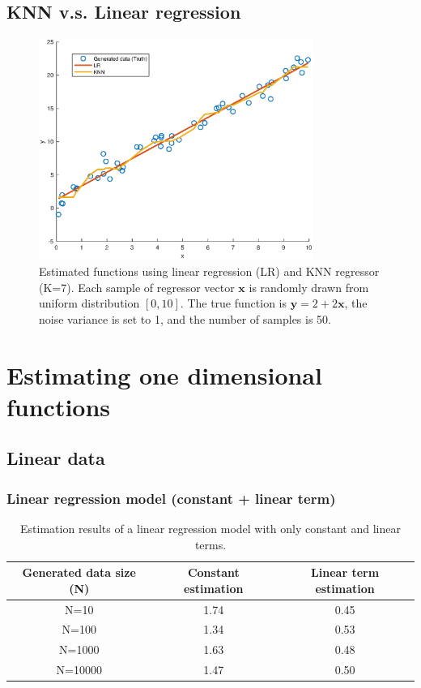 \documentclass[]{article}
\begin{document}
\subsection{KNN v.s. Linear regression}
\begin{figure}[H]
	\caption{Estimated functions using linear regression (LR) and KNN regressor (K=7). Each sample of regressor vector $\mathbf{x}$ is randomly drawn from uniform distribution $[0,10]$. The true function is $\mathbf{y}=2+2\mathbf{x}$, the noise variance is set to 1, and the number of samples is 50.}
	\centering
	\includegraphics[width=0.8\textwidth]{project2b}
\end{figure}

\section{Estimating one dimensional functions}

\subsection{Linear data}

\subsubsection{Linear regression model (constant + linear term)}
\begin{table}[H]
	\centering
	\caption{Estimation results of a linear regression model with only constant and linear terms.}
	\label{tab:linear}
	\begin{tabular}{@{}ccc@{}}
		\toprule
		Generated data size (N) & Constant estimation & Linear term estimation \\ \midrule
		N=10        & 1.74                & 0.45                   \\
		N=100       & 1.34                & 0.53                   \\
		N=1000      & 1.63                & 0.48                   \\
		N=10000     & 1.47                & 0.50                   \\ \bottomrule
	\end{tabular}
\end{table}
\end{document}
